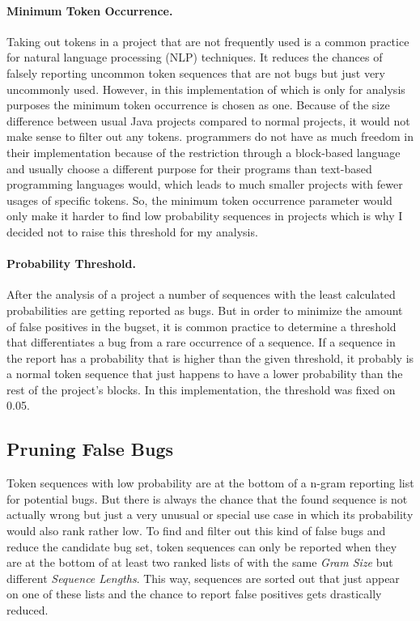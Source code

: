 \paragraph{Minimum Token Occurrence.}
Taking out tokens in a project that are not frequently used is a common practice for natural language processing (NLP) techniques. It reduces the chances of falsely reporting uncommon token sequences that are not bugs but just very uncommonly used. However, in this implementation of \ngram{} which is only for \scratch{} analysis purposes the minimum token occurrence is chosen as one. Because of the size difference between usual Java projects compared to normal \scratch{} projects, it would not make sense to filter out any tokens. \scratch{} programmers do not have as much freedom in their implementation because of the restriction through a block-based language and usually choose a different purpose for their programs than text-based programming languages would, which leads to much smaller projects with fewer usages of specific tokens. So, the minimum token occurrence parameter would only make it harder to find low probability sequences in projects which is why I decided not to raise this threshold for my analysis.
\paragraph{Probability Threshold.}
After the analysis of a project a number of sequences with the least calculated probabilities are getting reported as bugs. But in order to minimize the amount of false positives in the bugset, it is common practice to determine a threshold that differentiates a bug from a rare occurrence of a sequence. If a sequence in the report has a probability that is higher than the given threshold, it probably is a normal token sequence that just happens to have a lower probability than the rest of the project's blocks. In this implementation, the threshold was fixed on 0.05.

\subsection{Pruning False Bugs}\label{subsec:false_bugs}
Token sequences with low probability are at the bottom of a n-gram reporting list for potential bugs. But there is always the chance that the found sequence is not actually wrong but just a very unusual or special use case in which its probability would also rank rather low. To find and filter out this kind of false bugs and reduce the candidate bug set, token sequences can only be reported when they are at the bottom of at least two ranked lists of  with the same \textit{Gram Size} but different \textit{Sequence Lengths}. This way, sequences are sorted out that just appear on one of these lists and the chance to report false positives gets drastically reduced. 